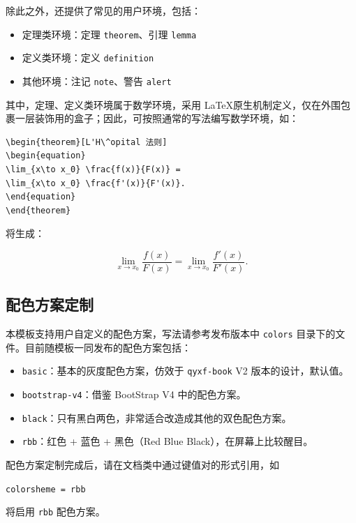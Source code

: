 \documentclass[
  xits = false,
  10pt,
  twoside,
  openany,
  b5paper, %
  colorscheme = basic %
]{qyxf-book}
\begin{document}
除此之外，还提供了常见的用户环境，包括：
\begin{itemize}
  \item 定理类环境：定理 \verb|theorem|、引理 \verb|lemma|
  \item 定义类环境：定义 \verb|definition|
  \item 其他环境：注记 \verb|note|、警告 \verb|alert|
\end{itemize}
其中，定理、定义类环境属于数学环境，采用 \LaTeX 原生机制定义，仅在外围包裹一层装饰用的盒子；因此，可按照通常的写法编写数学环境，如：
\begin{tcolorbox}
  \begin{verbatim}
\begin{theorem}[L'H\^opital 法则]
\begin{equation}
\lim_{x\to x_0} \frac{f(x)}{F(x)} =
\lim_{x\to x_0} \frac{f'(x)}{F'(x)}.
\end{equation}
\end{theorem}
\end{verbatim}
\end{tcolorbox}
将生成：
\begin{theorem}[L'H\^opital 法则]
\begin{equation}
\lim_{x\to x_0} \frac{f(x)}{F(x)} =
\lim_{x\to x_0} \frac{f'(x)}{F'(x)}.
\end{equation}
\end{theorem}

\subsection{配色方案定制}

本模板支持用户自定义的配色方案，写法请参考发布版本中 \verb|colors| 目录下的文件。目前随模板一同发布的配色方案包括：
\begin{itemize}
  \item \verb|basic|：基本的灰度配色方案，仿效于 \verb|qyxf-book| V2 版本的设计，默认值。
  \item \verb|bootstrap-v4|：借鉴 BootStrap V4 中的配色方案。
  \item \verb|black|：只有黑白两色，非常适合改造成其他的双色配色方案。
  \item \verb|rbb|：红色 + 蓝色 + 黑色（Red Blue Black），在屏幕上比较醒目。
\end{itemize}

配色方案定制完成后，请在文档类中通过键值对的形式引用，如
\begin{tcolorbox}
\verb|colorsheme = rbb| 
\end{tcolorbox}
将启用 \verb|rbb| 配色方案。
\end{document}
